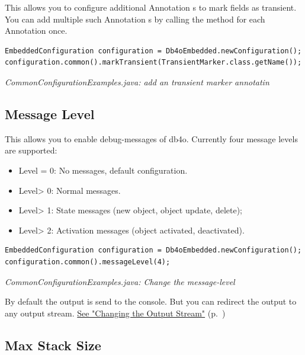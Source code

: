 This allows you to configure additional Annotation s to mark fields as transient. You can add multiple such Annotation s by calling the method for each Annotation once.

\begin{lstlisting}
EmbeddedConfiguration configuration = Db4oEmbedded.newConfiguration();
configuration.common().markTransient(TransientMarker.class.getName());
\end{lstlisting}

{\small\itshape CommonConfigurationExamples.java: add an transient marker annotatin\par}
\medskip

\subsection{Message Level}
\label{ref:configuration-common-message-level}

This allows you to enable debug-messages of db4o. Currently four message levels are supported:

\begin{itemize}
\item Level = 0: No messages, default configuration.
\item Level\textgreater{} 0: Normal messages.
\item Level\textgreater{} 1: State messages (new object, object update, delete);
\item Level\textgreater{} 2: Activation messages (object activated, deactivated).
\end{itemize}

\begin{lstlisting}
EmbeddedConfiguration configuration = Db4oEmbedded.newConfiguration();
configuration.common().messageLevel(4);
\end{lstlisting}

{\small\itshape CommonConfigurationExamples.java: Change the message-level\par}
\medskip

By default the output is send to the console. But you can redirect the output to any output stream. \hyperref[ref:configuration-common-out-stream]{See "Changing the Output Stream"} (p.~\pageref{ref:configuration-common-out-stream})

\subsection{Max Stack Size}
\label{ref:configuration-common-max-stack-size}

